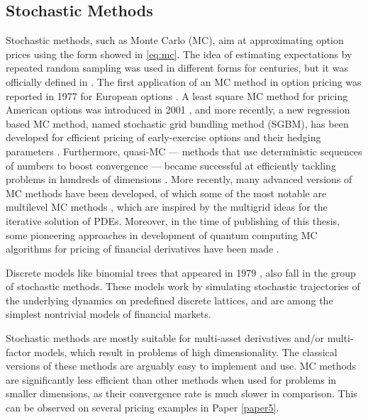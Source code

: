 \documentclass{UUThesisTemplate}
\begin{document}
\subsection{Stochastic Methods}
\par Stochastic methods, such as Monte Carlo (MC), aim at approximating option prices using the form showed in \eqref{eq:mc}. The idea of estimating expectations by repeated random sampling was used in different forms for centuries, but it was officially defined in \cite{metropolis1949monte}. The first application of an MC method in option pricing was reported in 1977 for European options \cite{boyle1977options}. A least square MC method for pricing American options was introduced in 2001 \cite{longstaff2001valuing}, and more recently, a new regression based MC method, named stochastic grid bundling method (SGBM), has been developed for efficient pricing of early-exercise options and their hedging parameters \cite{jain2015stochastic}. Furthermore, quasi-MC \cite{paskov1995faster} --- methods that use deterministic sequences of numbers to boost convergence --- became successful at efficiently tackling problems in hundreds of dimensions \cite{dick2013high}. More recently, many advanced versions of MC methods have been developed, of which some of the most notable are multilevel MC methods \cite{giles2008multilevel}, which are inspired by the multigrid ideas for the iterative solution of PDEs. %
Moreover, in the time of publishing of this thesis, some pioneering approaches in development of quantum computing MC algorithms for pricing of financial derivatives have been made \cite{rebentrost2018quantum}.
\par Discrete models like binomial trees that appeared in 1979 \cite{cox1979option, rendleman1979two}, also fall in the group of stochastic methods. These models work by simulating stochastic trajectories of the underlying dynamics on predefined discrete lattices, and are among the simplest nontrivial models of financial markets. 
\par Stochastic methods are mostly suitable for multi-asset derivatives and/or multi-factor models, which result in problems of high dimensionality. The classical versions of these methods are arguably easy to implement and use. MC methods are significantly less efficient than other methods when used for problems in smaller dimensions, as their convergence rate is much slower in comparison. This can be observed on several pricing examples in Paper \ref{paper5}. 
%
\end{document}
